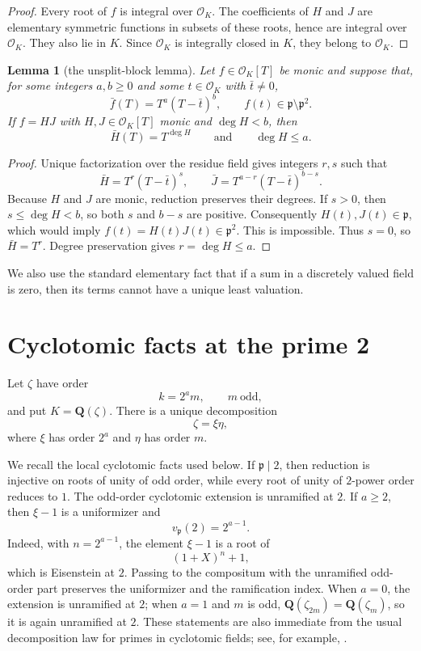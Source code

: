 \documentclass[11pt]{article}
\newtheorem{lemma}[theorem]{Lemma}
\newcommand{\Q}{\mathbf Q}
\newcommand{\OK}{\mathcal O_K}
\begin{document}
\begin{proof}
Every root of $f$ is integral over $\OK$.  The coefficients of $H$ and
$J$ are elementary symmetric functions in subsets of these roots, hence
are integral over $\OK$.  They also lie in $K$.  Since $\OK$ is
integrally closed in $K$, they belong to $\OK$.
\end{proof}

\begin{lemma}[the unsplit-block lemma]\label{lem:block}
Let $f\in\OK[T]$ be monic and suppose that, for some integers $a,b\geq0$
and some $t\in\OK$ with $\bar t\neq0$,
\[
 \bar f(T)=T^a(T-\bar t)^b,
 \qquad
 f(t)\in\mathfrak p\setminus\mathfrak p^2.
\]
If $f=HJ$ with $H,J\in\OK[T]$ monic and $\deg H<b$, then
\[
 \bar H(T)=T^{\deg H}
 \qquad\text{and}\qquad
 \deg H\leq a.
\]
\end{lemma}

\begin{proof}
Unique factorization over the residue field gives integers $r,s$ such
that
\[
 \bar H=T^r(T-\bar t)^s,
 \qquad
 \bar J=T^{a-r}(T-\bar t)^{b-s}.
\]
Because $H$ and $J$ are monic, reduction preserves their degrees.  If
$s>0$, then $s\leq\deg H<b$, so both $s$ and $b-s$ are positive.
Consequently $H(t),J(t)\in\mathfrak p$, which would imply
$f(t)=H(t)J(t)\in\mathfrak p^2$.  This is impossible.  Thus $s=0$,
so $\bar H=T^r$.  Degree preservation gives $r=\deg H\leq a$.
\end{proof}

We also use the standard elementary fact that if a sum in a discretely
valued field is zero, then its terms cannot have a unique least
valuation.

\section{Cyclotomic facts at the prime 2}

Let $\zeta$ have order
\[
 k=2^a m,
 \qquad m\ \text{odd},
\]
and put $K=\Q(\zeta)$.  There is a unique decomposition
\begin{equation}\label{eq:decomposition}
 \zeta=\xi\eta,
\end{equation}
where $\xi$ has order $2^a$ and $\eta$ has order $m$.

We recall the local cyclotomic facts used below.  If
$\mathfrak p\mid2$, then reduction is injective on roots of unity of odd
order, while every root of unity of $2$-power order reduces to $1$.
The odd-order cyclotomic extension is unramified at $2$.  If $a\geq2$,
then $\xi-1$ is a uniformizer and
\begin{equation}\label{eq:e-value}
 v_{\mathfrak p}(2)=2^{a-1}.
\end{equation}
Indeed, with $n=2^{a-1}$, the element $\xi-1$ is a root of
\[
 (1+X)^n+1,
\]
which is Eisenstein at $2$.  Passing to the compositum with the
unramified odd-order part preserves the uniformizer and the ramification
index.  When $a=0$, the extension is unramified at $2$; when $a=1$ and
$m$ is odd, $\Q(\zeta_{2m})=\Q(\zeta_m)$, so it is again unramified at
$2$.  These statements are also immediate from the usual decomposition
law for primes in cyclotomic fields; see, for example,
\cite[Chapter 2]{Washington1997}.
\end{document}
